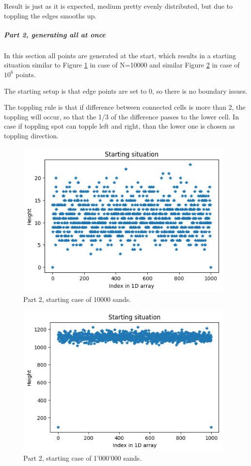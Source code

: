 \documentclass{article}
\begin{document}
Result is just as it is expected, medium pretty evenly distributed,  but due to toppling the edges smooths up.


\clearpage
\subparagraph*{Part 2, generating all at once\\}

In this section all points are generated at the start, which results in a starting situation similar to Figure \ref{fig:part2starting1000points} in case of N=10000 and similar Figure \ref{fig:part2start106} in case of $10^6$ points.

The starting setup is that edge points are set to 0, so there is no boundary issues. 

The toppling rule is that if difference between connected cells is more than 2, the toppling will occur, so that the 1/3 of the difference passes to the lower cell. In case if toppling spot can topple left and right, than the lower one is chosen as toppling direction. 



\begin{figure}[!hbt]
	\centering
	\includegraphics[width=4.3in]{part2starting1000points}
	\caption{Part 2, starting case of 10000 sands.}
	\label{fig:part2starting1000points}
\end{figure}


\begin{figure}[!hbt]
	\centering
	\includegraphics[width=4.3in]{part2start106}
	\caption{Part 2, starting case of 1'000'000 sands.}
	\label{fig:part2start106}
\end{figure}
\end{document}
